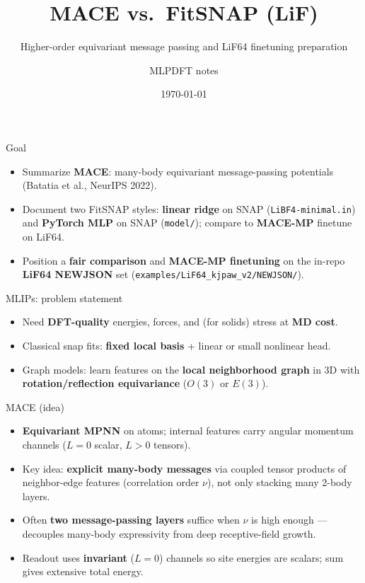 \documentclass[aspectratio=169]{beamer}
\title{MACE vs.\ FitSNAP (LiF)}
\subtitle{Higher-order equivariant message passing and LiF64 finetuning preparation}
\author{MLPDFT notes}
\date{\today}
\begin{document}
\begin{frame}
  \titlepage
\end{frame}

\begin{frame}{Goal}
  \begin{itemize}
    \item Summarize \textbf{MACE}: many-body equivariant message-passing potentials (Batatia et al., NeurIPS 2022).
    \item Document two FitSNAP styles: \textbf{linear ridge} on SNAP (\texttt{LiBF4-minimal.in}) and \textbf{PyTorch MLP} on SNAP (\texttt{model/}); compare to \textbf{MACE-MP} finetune on LiF64.
    \item Position a \textbf{fair comparison} and \textbf{MACE-MP finetuning} on the in-repo \textbf{LiF64 NEWJSON} set (\texttt{examples/LiF64\_kjpaw\_v2/NEWJSON/}).
  \end{itemize}
\end{frame}

\begin{frame}{MLIPs: problem statement}
  \begin{itemize}
    \item Need \textbf{DFT-quality} energies, forces, and (for solids) stress at \textbf{MD cost}.
    \item Classical snap fits: \textbf{fixed local basis} + linear or small nonlinear head.
    \item Graph models: learn features on the \textbf{local neighborhood graph} in 3D with \textbf{rotation/reflection equivariance} ($O(3)$ or $E(3)$).
  \end{itemize}
\end{frame}

\begin{frame}{MACE (idea)}
  \begin{itemize}
    \item \textbf{Equivariant MPNN} on atoms; internal features carry angular momentum channels ($L=0$ scalar, $L>0$ tensors).
    \item Key idea: \textbf{explicit many-body messages} via coupled tensor products of neighbor-edge features (correlation order $\nu$), not only stacking many 2-body layers.
    \item Often \textbf{two message-passing layers} suffice when $\nu$ is high enough --- decouples many-body expressivity from deep receptive-field growth.
    \item Readout uses \textbf{invariant} ($L{=}0$) channels so site energies are scalars; sum gives extensive total energy.
  \end{itemize}
\end{frame}
\end{document}
